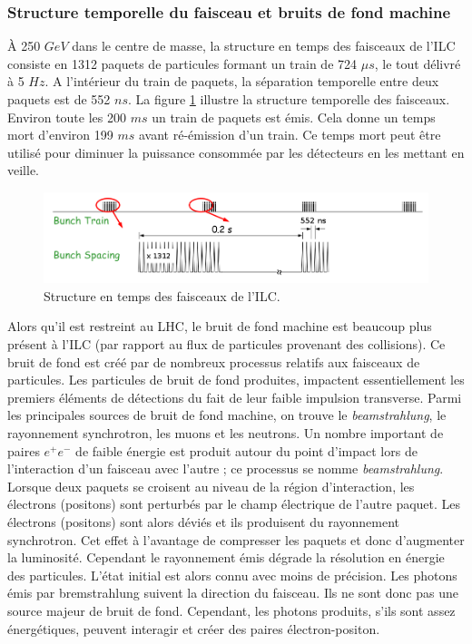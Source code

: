   \subsubsection{Structure temporelle du faisceau et bruits de fond machine}
  \label{sect:beamstrahlung}
  
  \`A 250 $GeV$ dans le centre de masse, la structure en temps des faisceaux de l'ILC consiste en 1312 paquets de particules formant un train de 724 $\mu s$, le tout d\'elivr\'e \`a 5 $Hz$. A l'int\'erieur du train de paquets, la s\'eparation temporelle entre deux paquets est de 552 $ns$. La figure \ref{fig:timeStructure} illustre la structure temporelle des faisceaux. Environ toute les 200 $ms$ un train de paquets est émis. Cela donne un temps mort d'environ 199 $ms$ avant r\'e-\'emission d'un train. Ce temps mort peut être utilis\'e pour diminuer la puissance consomm\'ee par les d\'etecteurs en les mettant en veille.
  
  \begin{figure}[!htb]
    \begin{center} 
      \includegraphics[scale=0.40]{./figures/bunch_structure.png}
      \caption{Structure en temps des faisceaux de l'ILC.}
      \label{fig:timeStructure}
    \end{center}
  \end{figure}  
  
  \medskip
  
  Alors qu'il est restreint au LHC, le bruit de fond machine est beaucoup plus pr\'esent \`a l'ILC (par rapport au flux de particules provenant des collisions). Ce bruit de fond est cr\'e\'e par de nombreux processus relatifs aux faisceaux de particules. Les particules de bruit de fond produites, impactent essentiellement les premiers \'el\'ements de d\'etections du fait de leur faible impulsion transverse. Parmi les principales sources de bruit de fond machine, on trouve le \textit{beamstrahlung}, le rayonnement synchrotron, les muons et les neutrons. Un nombre important de paires $e^+ e^-$ de faible \'energie est produit autour du point d'impact lors de l'interaction d'un faisceau avec l'autre ; ce processus se nomme \textit{beamstrahlung}. Lorsque deux paquets se croisent au niveau de la r\'egion d'interaction, les \'electrons (positons) sont perturb\'es par le champ \'electrique de l'autre paquet. Les électrons (positons) sont alors d\'evi\'es et ils produisent du rayonnement synchrotron. Cet effet \`a l'avantage de compresser les paquets et donc d'augmenter la luminosit\'e. Cependant le rayonnement \'emis d\'egrade la r\'esolution en \'energie des particules. L'\'etat initial est alors connu avec moins de pr\'ecision. Les photons \'emis par bremstrahlung suivent la direction du faisceau. Ils ne sont donc pas une source majeur de bruit de fond. Cependant, les photons produits, s'ils sont assez \'energ\'etiques, peuvent interagir et cr\'eer des paires \'electron-positon.
 
